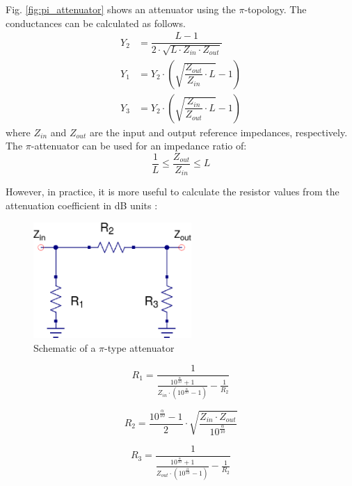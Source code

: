 Fig. \ref{fig:pi_attenuator} shows an attenuator using the
$\pi$-topology. The conductances can be calculated as follows.
\begin{align}
Y_2 & = \dfrac{L - 1}{2\cdot \sqrt{L\cdot Z_{in}\cdot Z_{out}}} \\
Y_1 & = Y_2\cdot\left( \sqrt{\dfrac{Z_{out}}{Z_{in}}\cdot L} - 1 \right) \\
Y_3 & = Y_2\cdot\left( \sqrt{\dfrac{Z_{in}}{Z_{out}}\cdot L} - 1 \right)
\end{align}
where $Z_{in}$ and $Z_{out}$ are the input and output reference
impedances, respectively. The $\pi$-attenuator can be used for an
impedance ratio of:
\begin{equation}
\dfrac{1}{L} \le \dfrac{Z_{out}}{Z_{in}} \le L
\end{equation}

\noindent However, in practice, it is more useful to calculate the resistor values from the attenuation coefficient in dB units \cite{Vizmuller}:

\begin{figure}[ht]
\begin{center}
\includegraphics[width=6cm]{Pi-Attenuator-Schematic.eps}
\end{center}
\caption{Schematic of a $\pi$-type attenuator}
\label{fig:pi_attenuator_schematic}
\end{figure}


\begin{equation}
 R_{1} = \frac{1}{\frac{10^{\frac{\alpha}{10}}+1}{Z_{in} \cdot (10^{\frac{\alpha}{10}}-1)} - \frac{1}{R_{2}}}
\end{equation}

\begin{equation}
 R_{2} = \frac{10^{\frac{\alpha}{10}}-1}{2} \cdot \sqrt{\frac{Z_{in}\cdot Z_{out}}{10^{\frac{\alpha}{10}}}}	
\end{equation}

\begin{equation}
 R_{3} = \frac{1}{\frac{10^{\frac{\alpha}{10}}+1}{Z_{out} \cdot (10^{\frac{\alpha}{10}}-1)} - \frac{1}{R_{2}}}
\end{equation}


